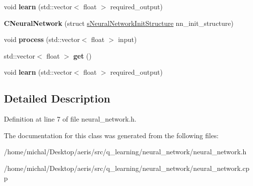 \begin{DoxyCompactItemize}
\item 
\hypertarget{classCNeuralNetwork_a4926c2b280154a13ea49e3f4d0d26b00}{void {\bfseries learn} (std\-::vector$<$ float $>$ required\-\_\-output)}\label{classCNeuralNetwork_a4926c2b280154a13ea49e3f4d0d26b00}

\item 
\hypertarget{classCNeuralNetwork_af2f5f3147ed5c69c3b648347817dc8d1}{{\bfseries C\-Neural\-Network} (struct \hyperlink{structsNeuralNetworkInitStructure}{s\-Neural\-Network\-Init\-Structure} nn\-\_\-init\-\_\-structure)}\label{classCNeuralNetwork_af2f5f3147ed5c69c3b648347817dc8d1}

\item 
\hypertarget{classCNeuralNetwork_a5296b2830588ff8ca2570f18750536b7}{void {\bfseries process} (std\-::vector$<$ float $>$ input)}\label{classCNeuralNetwork_a5296b2830588ff8ca2570f18750536b7}

\item 
\hypertarget{classCNeuralNetwork_aa9fe23130a9bb3b534a2e96fd07455c3}{std\-::vector$<$ float $>$ {\bfseries get} ()}\label{classCNeuralNetwork_aa9fe23130a9bb3b534a2e96fd07455c3}

\item 
\hypertarget{classCNeuralNetwork_a4926c2b280154a13ea49e3f4d0d26b00}{void {\bfseries learn} (std\-::vector$<$ float $>$ required\-\_\-output)}\label{classCNeuralNetwork_a4926c2b280154a13ea49e3f4d0d26b00}

\end{DoxyCompactItemize}


\subsection{Detailed Description}


Definition at line 7 of file neural\-\_\-network.\-h.



The documentation for this class was generated from the following files\-:\begin{DoxyCompactItemize}
\item 
/home/michal/\-Desktop/aeris/src/q\-\_\-learning/neural\-\_\-network/neural\-\_\-network.\-h\item 
/home/michal/\-Desktop/aeris/src/q\-\_\-learning/neural\-\_\-network/neural\-\_\-network.\-cpp\end{DoxyCompactItemize}
